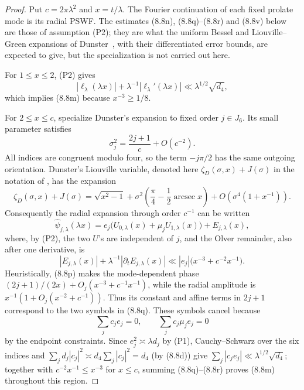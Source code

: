 \documentclass[11pt]{amsart}
\theoremstyle{definition}
\theoremstyle{remark}
\begin{document}
\begin{proof}
Put \(c=2\pi\lambda^2\) and \(x=t/\lambda\).  The Fourier continuation
of each fixed prolate mode is its radial PSWF.  The estimates (8.8n),
(8.8q)--(8.8r) and (8.8v) below are those of assumption (P2); they are
what the uniform Bessel and Liouville--Green expansions of
Dunster~\cite{DunsterPSWF}, with their differentiated error bounds, are
expected to give, but the specialization is not carried out here.

For \(1\le x\le2\), (P2) gives
\[
 |\ell_\lambda(\lambda x)|+
 \lambda^{-1}|\ell_\lambda'(\lambda x)|
 \ll\lambda^{1/2}\sqrt{d_4},
\tag{8.8n}
\]
which implies (8.8m) because \(x^{-3}\ge1/8\).

For \(2\le x\le c\), specialize Dunster's expansion to fixed order
\(j\in J_6\).  Its small parameter satisfies
\[
 \sigma_j^2=\frac{2j+1}{c}+O(c^{-2}).
\tag{8.8o}
\]
All indices are congruent modulo four, so the term \(-j\pi/2\) has the
same outgoing orientation.  Dunster's Liouville variable, denoted here
\(\zeta_D(\sigma,x)+J(\sigma)\) in the notation of \cite{DunsterPSWF},
has the expansion
\[
 \zeta_D(\sigma,x)+J(\sigma)
 =\sqrt{x^2-1}
 +\sigma^2\left(\frac\pi4-\frac12\operatorname {arcsec}x\right)
 +O\!\left(\sigma^4(1+x^{-1})\right).
\tag{8.8p}
\]
Consequently the radial expansion through order \(c^{-1}\) can be written
\[
 \widehat\psi_{j,\lambda}(\lambda x)
 =e_j\bigl(U_{0,\lambda}(x)+\mu_jU_{1,\lambda}(x)\bigr)
 +E_{j,\lambda}(x),
\tag{8.8q}
\]
where, by (P2), the two \(U\)'s are independent of \(j\), and the Olver
remainder, also after one derivative, is
\[
 |E_{j,\lambda}(x)|+
 \lambda^{-1}|\partial_tE_{j,\lambda}(x)|
 \ll |e_j|\bigl(x^{-3}+c^{-2}x^{-1}\bigr).
\tag{8.8r}
\]
Heuristically, (8.8p) makes the mode-dependent phase
\((2j+1)/(2x)+O_j(x^{-3}+c^{-1}x^{-1})\), while the radial amplitude is
\(x^{-1}(1+O_j(x^{-2}+c^{-1}))\).  Thus its constant and affine terms in
\(2j+1\) correspond to the two symbols in (8.8q).  These symbols
cancel because
\[
 \sum_jc_je_j=0,
 \qquad
 \sum_jc_j\mu_je_j=0
\tag{8.8s}
\]
by the endpoint constraints.  Since \(e_j^2\asymp\lambda d_j\) by
(P1), Cauchy--Schwarz over the six indices and
\(\sum_jd_j|c_j|^2\asymp d_4\sum_j|c_j|^2=d_4\) (by (8.8d)) give
\(\sum_j|c_je_j|\ll\lambda^{1/2}\sqrt{d_4}\); together with
\(c^{-2}x^{-1}\le x^{-3}\) for \(x\le c\), summing (8.8q)--(8.8r)
proves (8.8m) throughout this region.


\end{proof}
\end{document}
